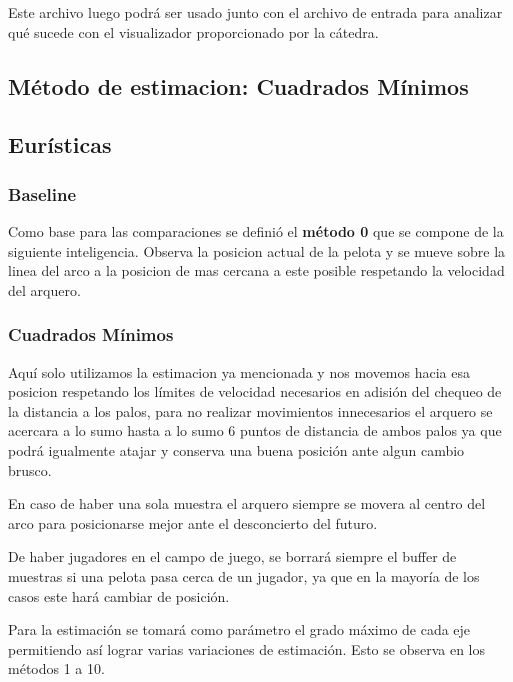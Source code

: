 Este archivo luego podrá ser usado junto con el archivo de entrada para analizar qué sucede con el visualizador proporcionado por la cátedra.


\subsection{Método de estimacion: Cuadrados Mínimos}








\subsection{Eur\'isticas}

\subsubsection{Baseline}
Como base para las comparaciones se defini\'o el \textbf{m\'etodo 0} que se compone de la siguiente inteligencia.
Observa la posicion actual de la pelota y se mueve sobre la linea del arco a la posicion de mas cercana a este posible respetando la velocidad del arquero.

\subsubsection{Cuadrados M\'inimos}
Aqu\'i solo utilizamos la estimacion ya mencionada y nos movemos hacia esa posicion respetando los l\'imites de velocidad necesarios en adisi\'on del chequeo de la distancia a los palos, para no realizar movimientos innecesarios el arquero se acercara a lo sumo hasta a lo sumo 6 puntos de distancia de ambos palos ya que podr\'a igualmente atajar y conserva una buena posici\'on ante algun cambio brusco.

En caso de haber una sola muestra el arquero siempre se movera al centro del arco para posicionarse mejor ante el desconcierto del futuro.

De haber jugadores en el campo de juego, se borrar\'a siempre el buffer de muestras si una pelota pasa cerca de un jugador, ya que en la mayor\'ia de los casos este har\'a cambiar de posici\'on.

Para la estimaci\'on se tomar\'a como par\'ametro el grado m\'aximo de cada eje permitiendo as\'i lograr varias variaciones de estimaci\'on. Esto se observa en los m\'etodos 1 a 10.

